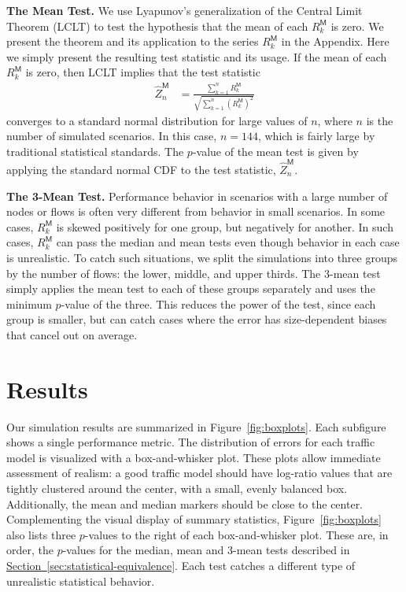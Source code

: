 \documentclass[conference]{IEEEtran}
\newcommand{\caps}[1]{{\small{#1}}}
\newcommand{\Section}[1]{\hyperref[sec:#1]{Section~\ref*{sec:#1}}}
\newcommand{\M}{\mathsf{M}}
\begin{document}
\textbf{The Mean Test.} We use Lyapunov's generalization of the Central Limit Theorem (\caps{LCLT}) to test the hypothesis that the mean of each $R_k^\M$ is zero. We present the theorem and its application to the series $R_k^\M$ in the Appendix. Here we simply present the resulting test statistic and its usage. If the mean of each $R_k^\M$ is zero, then \caps{LCLT} implies that the test statistic
\begin{align}
\hat{Z}_n^\M &= \frac{\sum_{k=1}^n{R_k^\M}}{\sqrt{\sum_{k=1}^n{(R_k^\M)^2}}}
\end{align}
converges to a standard normal distribution for large values of $n$, where $n$ is the number of simulated scenarios. In this case, $n=144$, which is fairly large by traditional statistical standards. The $p$-value of the mean test is given by applying the standard normal \caps{CDF} to the test statistic, $\hat{Z}_n^\M$.

\textbf{The 3-Mean Test.} Performance behavior in scenarios with a large number of nodes or flows is often very different from behavior in small scenarios. In some cases, $R_k^\M$ is skewed positively for one group, but negatively for another. In such cases, $R_k^\M$ can pass the median and mean tests even though behavior in each case is unrealistic. To catch such situations, we split the simulations into three groups by the number of flows: the lower, middle, and upper thirds. The 3-mean test simply applies the mean test to each of these groups separately and uses the minimum $p$-value of the three. This reduces the power of the test, since each group is smaller, but can catch cases where the error has size-dependent biases that cancel out on average.

\section{Results}\label{sec:results}

Our simulation results are summarized in Figure~\ref{fig:boxplots}. Each subfigure shows a single performance metric. The distribution of errors for each traffic model is visualized with a box-and-whisker plot. These plots allow immediate assessment of realism: a good traffic model should have log-ratio values that are tightly clustered around the center, with a small, evenly balanced box. Additionally, the mean and median markers should be close to the center. Complementing the visual display of summary statistics, Figure~\ref{fig:boxplots} also lists three $p$-values to the right of each box-and-whisker plot. These are, in order, the $p$-values for the median, mean and 3-mean tests described in \Section{statistical-equivalence}. Each test catches a different type of unrealistic statistical behavior.
\end{document}
